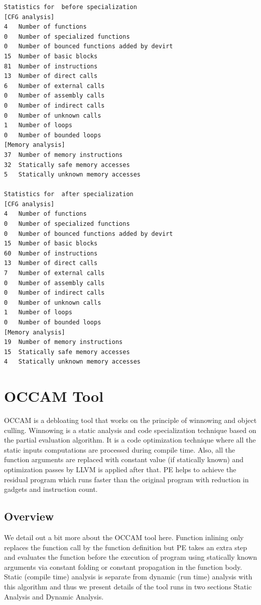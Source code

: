 \documentclass{relatorio}
\begin{document}
\begin{lstlisting}
Statistics for  before specialization
[CFG analysis]
4 	Number of functions
0 	Number of specialized functions
0 	Number of bounced functions added by devirt
15 	Number of basic blocks
81 	Number of instructions
13 	Number of direct calls
6 	Number of external calls
0 	Number of assembly calls
0 	Number of indirect calls
0 	Number of unknown calls
1 	Number of loops   
0 	Number of bounded loops
[Memory analysis]
37 	Number of memory instructions
32 	Statically safe memory accesses
5 	Statically unknown memory accesses

Statistics for  after specialization
[CFG analysis]
4 	Number of functions
0 	Number of specialized functions
0 	Number of bounced functions added by devirt
15	Number of basic blocks
60 	Number of instructions
13 	Number of direct calls
7 	Number of external calls
0 	Number of assembly calls
0 	Number of indirect calls
0 	Number of unknown calls
1 	Number of loops   
0 	Number of bounded loops
[Memory analysis]
19 	Number of memory instructions
15 	Statically safe memory accesses
4 	Statically unknown memory accesses
\end{lstlisting} 

\section{OCCAM Tool}%
\label{Tools}

OCCAM is a debloating tool that works on the principle of winnowing and object culling. Winnowing is a static analysis and code specialization technique based on the partial evaluation algorithm. It is a code optimization technique where all the static inputs computations are processed during compile time. Also, all the function arguments 
are replaced with constant value (if statically known) and optimization passes by LLVM is applied after that. PE helps to achieve the residual program which runs faster than the original program with reduction in gadgets and instruction count. 

\subsection{Overview}%
\label{Tools}

We detail out a bit more about the OCCAM tool here. Function inlining only replaces the function call by the function definition but PE takes an extra step and evaluates the function before the execution of program using statically known arguments via constant folding or constant propagation in the function body. Static (compile time) analysis is separate from dynamic (run time) analysis with this algorithm and thus we present details of the tool runs in two sections Static Analysis and Dynamic Analysis.
\end{document}
